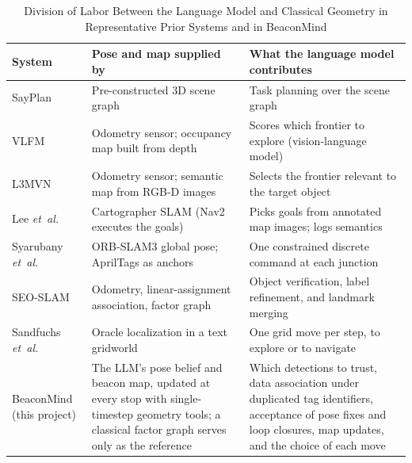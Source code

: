 \documentclass[conference]{IEEEtran}
\begin{document}
\begin{table}[t]
\caption{Division of Labor Between the Language Model and Classical Geometry in Representative Prior Systems and in BeaconMind}
\label{tab:division}
\centering
\footnotesize
\renewcommand{\arraystretch}{1.1}
\begin{tabular}{p{} p{} p{}}
\hline
\textbf{System} & \textbf{Pose and map supplied by} & \textbf{What the language model contributes} \\
\hline
SayPlan~\cite{rana2023sayplan} & Pre-constructed 3D scene graph & Task planning over the scene graph \\
VLFM~\cite{yokoyama2024vlfm} & Odometry sensor; occupancy map built from depth & Scores which frontier to explore (vision-language model) \\
L3MVN~\cite{yu2023l3mvn} & Odometry sensor; semantic map from RGB-D images & Selects the frontier relevant to the target object \\
Lee \textit{et~al.}~\cite{lee2026spatial} & Cartographer SLAM (Nav2 executes the goals) & Picks goals from annotated map images; logs semantics \\
Syarubany \textit{et~al.}~\cite{syarubany2026llm} & ORB-SLAM3 global pose; AprilTags as anchors & One constrained discrete command at each junction \\
SEO-SLAM~\cite{hong2025seoslam} & Odometry, linear-assignment association, factor graph & Object verification, label refinement, and landmark merging \\
Sandfuchs \textit{et~al.}~\cite{sandfuchs2026llms} & Oracle localization in a text gridworld & One grid move per step, to explore or to navigate \\
\hline
BeaconMind (this project) & The LLM's pose belief and beacon map, updated at every stop with single-timestep geometry tools; a classical factor graph serves only as the reference & Which detections to trust, data association under duplicated tag identifiers, acceptance of pose fixes and loop closures, map updates, and the choice of each move \\
\hline
\end{tabular}
\end{table}
\end{document}
